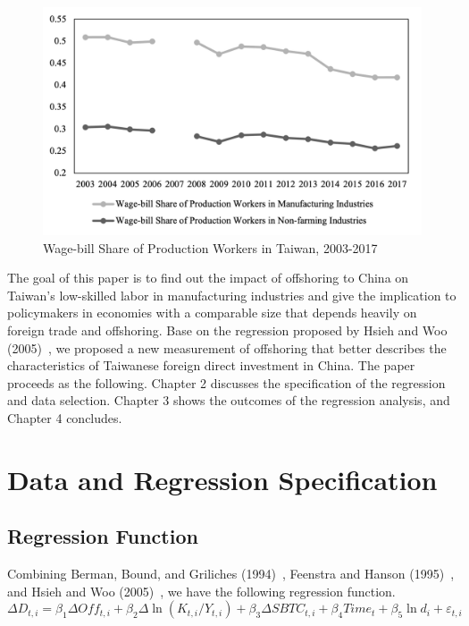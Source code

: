 \documentclass{article}
\begin{document}
\begin{figure}
\centering
\includegraphics[width=1\textwidth]{figure2.png}
\caption{\label{fig:2}Wage-bill Share of Production Workers in Taiwan, 2003-2017}
\end{figure}
The goal of this paper is to find out the impact of offshoring to China on Taiwan’s low-skilled labor in manufacturing industries and give the implication to policymakers in economies with a comparable size that depends heavily on foreign trade and offshoring. Base on the regression proposed by Hsieh and Woo (2005)~\cite{hsieh2005impact}, we proposed a new measurement of offshoring that better describes the characteristics of Taiwanese foreign direct investment in China. 
The paper proceeds as the following. Chapter 2 discusses the specification of the regression and data selection. Chapter 3 shows the outcomes of the regression analysis, and Chapter 4 concludes.


\section{Data and Regression Specification}

\subsection{Regression Function}

Combining Berman, Bound, and Griliches (1994)~\cite{berman1994changes}, Feenstra and Hanson (1995)~\cite{feenstra1995foreign}, and Hsieh and Woo (2005)~\cite{hsieh2005impact}, we have the following regression function.
$$\Delta D_{t,i}=\beta_1\Delta Off_{t,i}+\beta_2\Delta\ln(K_{t,i}/Y_{t,i})+\beta_3\Delta SBTC_{t,i}+\beta_4 Time_t+\beta_5\ln d_i+\varepsilon_{t,i}$$\par
\end{document}
